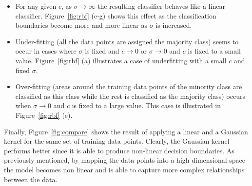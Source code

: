 \documentclass[conference,compsoc]{IEEEtran}
\begin{document}
\begin{itemize}  
\item For any given $c$, as $\sigma \to \infty$ the resulting classifier behaves like a linear classifier. Figure~\ref{fig:rbf} (e-g) shows this effect as the classification boundaries become more and more linear as $\sigma$ is increased.
\item Under-fitting (all the data points are assigned the majority class) seems to occur in cases where $\sigma$ is fixed and $c \to 0$ or $\sigma \to 0$ and $c$ is fixed to a small value. Figure~\ref{fig:rbf} (a) illustrates a case of underfitting with a small $c$ and fixed $\sigma$.
\item Over-fitting (areas around the training data points of the minority class are classified as this class while the rest is classified as the majority class) occurs when $\sigma \to 0$ and $c$ is fixed to a large value. This case is illustrated in Figure~\ref{fig:rbf} (e).

\end{itemize}
Finally, Figure~\ref{fig:compare} shows the result of applying a linear and a Gaussian kernel for the same set of training data points. Clearly, the Gaussian kernel performs better since it is able to produce non-linear decision boundaries. As previously mentioned, by mapping the data points into a high dimensional space the model becomes non linear and is able to capture more complex relationships between the data.
\end{document}
